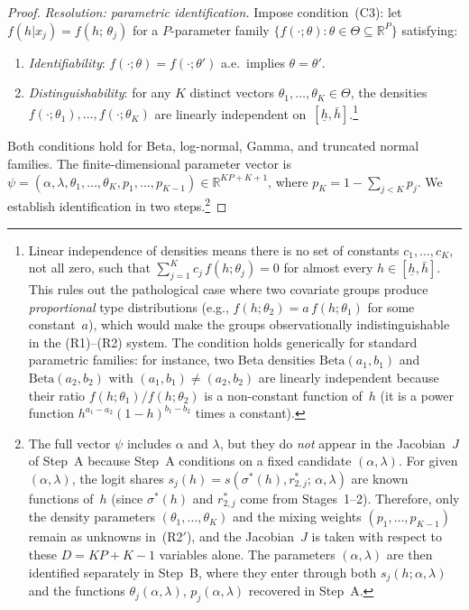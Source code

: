 \documentclass[12pt]{article}
\theoremstyle{plain}
\theoremstyle{plain}
\theoremstyle{definition}
\theoremstyle{remark}
\begin{document}
\begin{proof}
\emph{Resolution: parametric identification.}  Impose condition~(C3): let $f(h|x_j) = f(h;\,\theta_j)$ for a $P$-parameter family $\{f(\cdot;\theta) : \theta \in \Theta \subseteq \mathbb{R}^P\}$ satisfying:
\begin{enumerate}
    \item[(P1)] \emph{Identifiability}: $f(\cdot;\theta) = f(\cdot;\theta')$ a.e.\ implies $\theta = \theta'$.
    \item[(P2)] \emph{Distinguishability}: for any $K$ distinct vectors $\theta_1,\ldots,\theta_K \in \Theta$, the densities $f(\cdot;\theta_1), \ldots, f(\cdot;\theta_K)$ are linearly independent on~$[\underline{h},\bar{h}]$.\footnote{Linear independence of densities means there is no set of constants $c_1, \ldots, c_K$, not all zero, such that $\sum_{j=1}^K c_j\, f(h;\theta_j) = 0$ for almost every $h \in [\underline{h}, \bar{h}]$.  This rules out the pathological case where two covariate groups produce \emph{proportional} type distributions (e.g., $f(h;\theta_2) = a\, f(h;\theta_1)$ for some constant~$a$), which would make the groups observationally indistinguishable in the (R1)--(R2) system.  The condition holds generically for standard parametric families: for instance, two Beta densities $\text{Beta}(a_1,b_1)$ and $\text{Beta}(a_2,b_2)$ with $(a_1,b_1) \neq (a_2,b_2)$ are linearly independent because their ratio $f(h;\theta_1)/f(h;\theta_2)$ is a non-constant function of~$h$ (it is a power function $h^{a_1-a_2}(1-h)^{b_1-b_2}$ times a constant).}
\end{enumerate}
Both conditions hold for Beta, log-normal, Gamma, and truncated normal families.  The finite-dimensional parameter vector is $\psi = (\alpha,\lambda,\theta_1,\ldots,\theta_K,p_1,\ldots,p_{K-1}) \in \mathbb{R}^{KP+K+1}$, where $p_K = 1 - \sum_{j<K} p_j$.  We establish identification in two steps.\footnote{The full vector $\psi$ includes $\alpha$ and $\lambda$, but they do \emph{not} appear in the Jacobian~$J$ of Step~A because Step~A conditions on a fixed candidate $(\alpha,\lambda)$.  For given $(\alpha,\lambda)$, the logit shares $s_j(h) = s(\sigma^*(h), r_{2,j}^*;\,\alpha,\lambda)$ are known functions of~$h$ (since $\sigma^*(h)$ and $r_{2,j}^*$ come from Stages~1--2).  Therefore, only the density parameters $(\theta_1,\ldots,\theta_K)$ and the mixing weights $(p_1,\ldots,p_{K-1})$ remain as unknowns in~(R2$'$), and the Jacobian~$J$ is taken with respect to these $D = KP + K - 1$ variables alone.  The parameters $(\alpha,\lambda)$ are then identified separately in Step~B, where they enter through both $s_j(h;\alpha,\lambda)$ and the functions $\theta_j(\alpha,\lambda)$, $p_j(\alpha,\lambda)$ recovered in Step~A.}


\end{proof}
\end{document}
